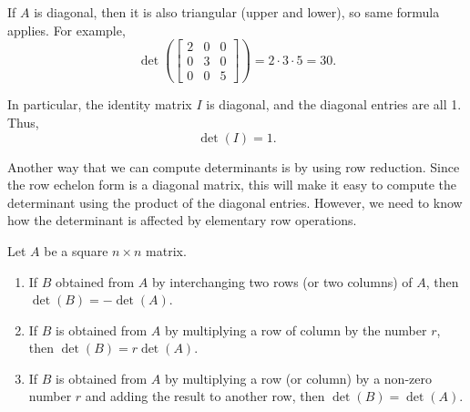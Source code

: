 \documentclass{ximera}
\begin{document}
If $A$ is diagonal, then it is also triangular (upper and lower), so same formula applies.  For example,
\begin{equation*}
    \det 
    \left(
        \begin{bmatrix}
            2 & 0 & 0 \\
            0 & 3 & 0 \\
            0 & 0 & 5
        \end{bmatrix}
    \right)
    = 2 \cdot 3 \cdot 5 = 30 .
\end{equation*}

In particular, the identity matrix $I$ is diagonal, and the diagonal entries are all 1.  Thus,
\begin{equation*}
    \det(I) = 1 .
\end{equation*}

Another way that we can compute determinants is by using row reduction. Since the row echelon form is a diagonal matrix, this will make it easy to compute the determinant using the product of the diagonal entries. However, we need to know how the determinant is affected by elementary row operations.

\begin{theorem}
    \label{detElem}
    Let $A$ be a square $n\times n$ matrix. 
    \begin{enumerate}
        \item If $B$ obtained from $A$ by interchanging two rows (or two columns) of $A$, then $\det(B) = -\det(A)$.
        \item If $B$ is obtained from $A$ by multiplying a row of column by the number $r$, then $\det(B) = r\det(A)$.
        \item If $B$ is obtained from $A$ by multiplying a row (or column) by a non-zero number $r$ and adding the result to another row, then $\det(B) = \det(A)$.
    \end{enumerate}
\end{theorem} 
\end{document}
